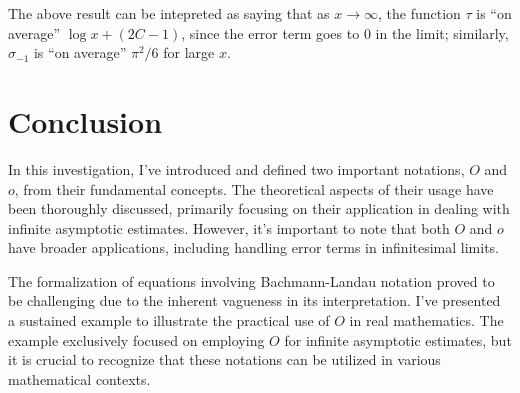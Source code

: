 \documentclass[9pt]{report}
\theoremstyle{definition}
\begin{document}
The above result can be intepreted as saying that as \(x\to\infty\), the function \(\tau\) is ``on average'' \(\log x + (2C-1)\), since the error term goes to \(0\) in the limit;
similarly, \(\sigma_{-1}\) is ``on average'' \(\pi^2/6\) for large \(x\).


\chapter{Conclusion}\label{ssec:conclusion}

In this investigation, I've introduced and defined two important notations, $O$ and $o$, from their fundamental concepts. The theoretical aspects of their usage have been thoroughly discussed, primarily focusing on their application in dealing with infinite asymptotic estimates. However, it's important to note that both $O$ and $o$ have broader applications, including handling error terms in infinitesimal limits.

The formalization of equations involving Bachmann-Landau notation proved to be challenging due to the inherent vagueness in its interpretation. I've presented a sustained example to illustrate the practical use of $O$ in real mathematics. The example exclusively focused on employing $O$ for infinite asymptotic estimates, but it is crucial to recognize that these notations can be utilized in various mathematical contexts.



\newpage

\printbibliography
\end{document}
